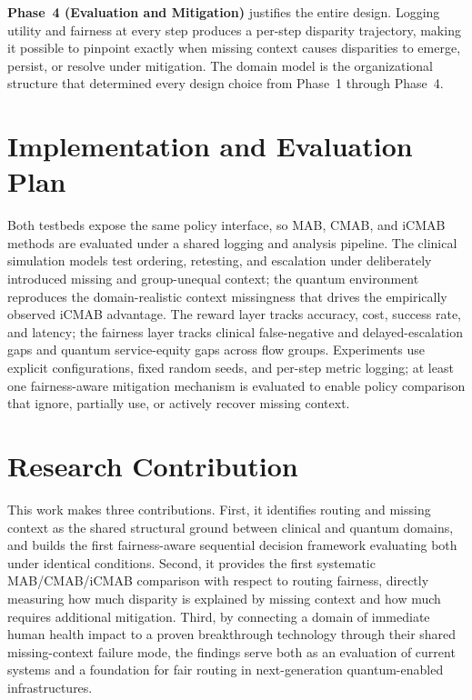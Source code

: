 \documentclass{IEEEtran}
\begin{document}
\textbf{Phase~4 (Evaluation and Mitigation)} justifies the entire design.
Logging utility and fairness at every step produces a per-step disparity
trajectory, making it possible to pinpoint exactly when missing context
causes disparities to emerge, persist, or resolve under mitigation. The
domain model is the organizational structure that determined every design
choice from Phase~1 through Phase~4.

\section{Implementation and Evaluation Plan}

Both testbeds expose the same policy interface, so MAB, CMAB, and iCMAB
methods are evaluated under a shared logging and analysis pipeline. The
clinical simulation models test ordering, retesting, and escalation under
deliberately introduced missing and group-unequal context; the quantum
environment reproduces the domain-realistic context missingness that drives
the empirically observed iCMAB advantage. The reward layer tracks accuracy,
cost, success rate, and latency; the fairness layer tracks clinical
false-negative and delayed-escalation gaps and quantum service-equity gaps
across flow groups. Experiments use explicit configurations, fixed
random seeds, and per-step metric logging; at least one fairness-aware
mitigation mechanism is evaluated to enable policy comparison
that ignore, partially use, or actively recover missing context.

\section{Research Contribution}

This work makes three contributions. First, it identifies routing and missing
context as the shared structural ground between clinical and quantum domains,
and builds the first fairness-aware sequential decision framework evaluating
both under identical conditions. Second, it provides the first systematic
MAB/CMAB/iCMAB comparison with respect to routing fairness, directly
measuring how much disparity is explained by missing context and how much
requires additional mitigation. Third, by connecting a domain of immediate
human health impact to a proven breakthrough technology through their shared
missing-context failure mode, the findings serve both as an evaluation of
current systems and a foundation for fair routing in next-generation
quantum-enabled infrastructures.
\end{document}
